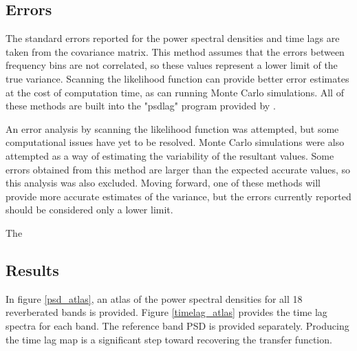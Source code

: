 \documentclass[11pt,letterpaper]{article}
\begin{document}
	\subsection{Errors}
	The standard errors reported for the power spectral densities and time lags are taken from the covariance matrix. This method assumes that the errors between frequency bins are not correlated, so these values represent a lower limit of the true variance. Scanning the likelihood function can provide better error estimates at the cost of computation time, as can running Monte Carlo simulations. All of these methods are built into the "psdlag" program provided by \cite{2013ApJ...777...24Z}.

    An error analysis by scanning the likelihood function was attempted, but some computational issues have yet to be resolved. Monte Carlo simulations were also attempted as a way of estimating the variability of the resultant values. Some errors obtained from this method are larger than the expected accurate values, so this analysis was also excluded. Moving forward, one of these methods will provide more accurate estimates of the variance, but the errors currently reported should be considered only a lower limit.

    The 

    \subsection{Results}
    \label{results}

    In figure \ref{psd_atlas}, an atlas of the power spectral densities for all 18 reverberated bands is provided. Figure \ref{timelag_atlas} provides the time lag spectra for each band. The reference band PSD is provided separately. Producing the time lag map is a significant step toward recovering the transfer function.
\end{document}
